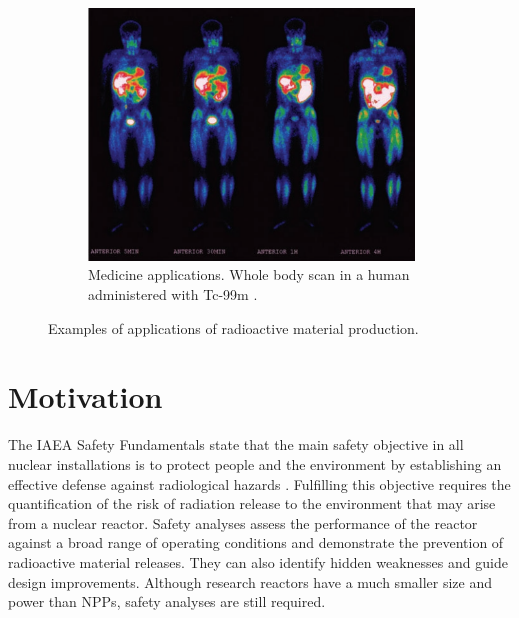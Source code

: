 \begin{figure}[!htbp]
\begin{subfigure}[b]{0.53\textwidth}
  \end{subfigure}
  \hfill
  \begin{subfigure}[b]{0.49\textwidth}
    \centering
    \includegraphics[width=0.95\textwidth]{figures/tc-99}
    \caption{Medicine applications. Whole body scan in a human administered with Tc-99m \cite{tc99m}.}
  \end{subfigure}
  \caption{Examples of applications of radioactive material production.}
  \label{fig:intro-2}
\end{figure}



\section{Motivation}


The \gls*{IAEA} Safety Fundamentals state that the main safety objective in all nuclear installations is to protect people and the environment by establishing an effective defense against radiological hazards \cite{iaea-safety2}.
Fulfilling this objective requires the quantification of the risk of radiation release to the environment that may arise from a nuclear reactor.
Safety analyses assess the performance of the reactor against a broad range of operating conditions and demonstrate the prevention of radioactive material releases.
They can also identify hidden weaknesses and guide design improvements.
Although research reactors have a much smaller size and power than \glspl*{NPP}, safety analyses are still required.

